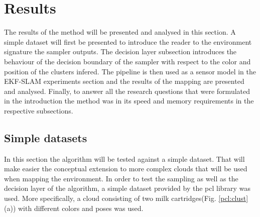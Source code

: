 \documentclass[twoside,hidelinks]{article}
\begin{document}
\newpage
\section{Results}
\label{sec:results}

The results of the method will be presented and analysed in this section. A simple dataset will first be presented to introduce the reader to the environment signature the sampler outputs. The decision layer subsection introduces the behaviour of the decision boundary of the sampler with respect to the color and position of the clusters infered. The pipeline is then used as a sensor model in the EKF-SLAM experiments section and the results of the mapping are presented and analysed. Finally, to answer all the research questions that were formulated in the introduction the method was in its speed and memory requirements in the respective subsections.


\subsection{Simple datasets}

In this section the algorithm will be tested against a simple dataset. That will make easier the conceptual extension to more complex clouds that will be used when mapping the environment. In order to test the sampling as well as the decision layer of the algorithm, a simple dataset provided by the pcl\cite{pcl} library was used. More specifically, a cloud consisting of two milk cartridges(Fig. \ref{pcl:clust}(a)) with different colors and poses was used. 
\end{document}
